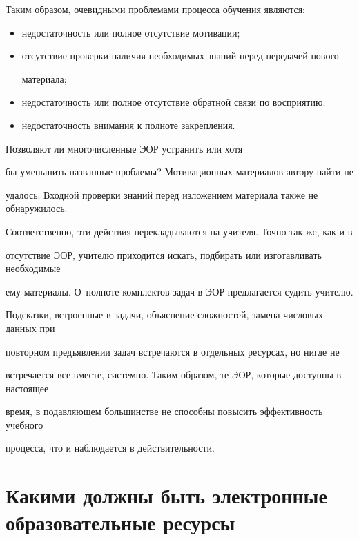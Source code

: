 Таким образом, очевидными проблемами процесса обучения являются:


\begin{itemize}


\item недостаточность или полное отсутствие мотивации;


\item отсутствие проверки наличия необходимых знаний перед передачей нового 


материала;


\item недостаточность или полное отсутствие обратной связи по восприятию;


\item недостаточность внимания к полноте закрепления.


\end{itemize}





Позволяют ли многочисленные ЭОР устранить или хотя 


бы уменьшить названные проблемы? Мотивационных материалов автору найти не 


удалось. Входной проверки знаний перед изложением материала также не обнаружилось. 


Соответственно, эти действия перекладываются на учителя. Точно так же, как и в 


отсутствие ЭОР, учителю приходится искать, подбирать или изготавливать необходимые 


ему материалы. О~полноте комплектов задач в ЭОР предлагается судить учителю. 


Подсказки, встроенные в задачи, объяснение сложностей, замена числовых данных при 


повторном предъявлении задач встречаются в отдельных ресурсах, но нигде не 


встречается все вместе, системно. Таким образом, те ЭОР, которые доступны в настоящее 


время, в по\-дав\-ля\-ющем большинстве не способны повысить эффективность учебного 


процесса, что и наблюдается в действительности.





\section{Какими должны быть электронные образовательные ресурсы}





